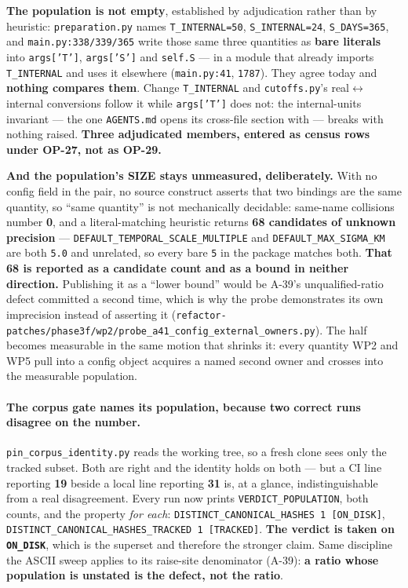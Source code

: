 \documentclass[
  10pt,
]{article}
\begin{document}
\textbf{The population is not empty}, established by adjudication rather than by heuristic: \texttt{preparation.py} names \texttt{T\_INTERNAL=50}, \texttt{S\_INTERNAL=24}, \texttt{S\_DAYS=365}, and \texttt{main.py:338/339/365} write those same three quantities as \textbf{bare literals} into \texttt{args['T']}, \texttt{args['S']} and \texttt{self.S} --- in a module that already imports \texttt{T\_INTERNAL} and uses it elsewhere (\texttt{main.py:41}, \texttt{1787}). They agree today and \textbf{nothing compares them}. Change \texttt{T\_INTERNAL} and \texttt{cutoffs.py}'s real$\leftrightarrow$internal conversions follow it while \texttt{args['T']} does not: the internal-units invariant --- the one \texttt{AGENTS.md} opens its cross-file section with --- breaks with nothing raised. \textbf{Three adjudicated members, entered as census rows under OP-27, not as OP-29.}

\textbf{And the population's SIZE stays unmeasured, deliberately.} With no config field in the pair, no source construct asserts that two bindings are the same quantity, so ``same quantity'' is not mechanically decidable: same-name collisions number \textbf{0}, and a literal-matching heuristic returns \textbf{68 candidates of unknown precision} --- \texttt{DEFAULT\_TEMPORAL\_SCALE\_MULTIPLE} and \texttt{DEFAULT\_MAX\_SIGMA\_KM} are both \texttt{5.0} and unrelated, so every bare \texttt{5} in the package matches both. \textbf{That 68 is reported as a candidate count and as a bound in neither direction.} Publishing it as a ``lower bound'' would be A-39's unqualified-ratio defect committed a second time, which is why the probe demonstrates its own imprecision instead of asserting it (\texttt{refactor-patches/\allowbreak{}phase3f/wp2/\allowbreak{}probe\_a41\_config\_external\_owners.py}). The half becomes measurable in the same motion that shrinks it: every quantity WP2 and WP5 pull into a config object acquires a named second owner and crosses into the measurable population.

\paragraph{The corpus gate names its population, because two correct runs disagree on the number.}
\texttt{pin\_corpus\_identity.py} reads the working tree, so a fresh clone sees only the tracked subset. Both are right and the identity holds on both --- but a CI line reporting \textbf{19} beside a local line reporting \textbf{31} is, at a glance, indistinguishable from a real disagreement. Every run now prints \texttt{VERDICT\_POPULATION}, both counts, and the property \emph{for each}: \texttt{DISTINCT\_CANONICAL\_HASHES 1 [ON\_DISK]}, \texttt{DISTINCT\_CANONICAL\_HASHES\_TRACKED 1 [TRACKED]}. \textbf{The verdict is taken on \texttt{ON\_DISK}}, which is the superset and therefore the stronger claim. Same discipline the ASCII sweep applies to its raise-site denominator (A-39): \textbf{a ratio whose population is unstated is the defect, not the ratio}.
\end{document}
